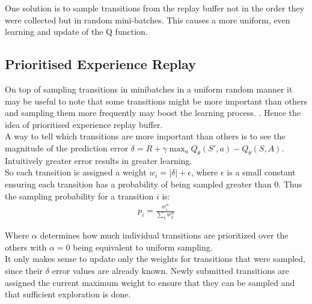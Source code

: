 One solution is to sample transitions from the replay buffer not in the order they were collected but in random mini-batches. This causes a more uniform, even learning and update of the Q function.  


\subsection{Prioritised Experience Replay}

On top of sampling transitions in minibatches in a uniform random manner it may be useful to note that some transitions might be more important than others and sampling them more frequently may boost the learning process. \cite{lecture_dqn}. Hence the idea of prioritised experience replay buffer. \\

A way to tell which transitions are more important than others is to see the magnitude of the prediction error $\delta = R + \gamma \max_a Q_{\theta}(S', a) - Q_{\theta}(S, A)$. 
Intuitively greater error results in greater learning.\\

So each transition is assigned a weight $w_i = |\delta| + \epsilon$, where $\epsilon$ is a small constant ensuring each transition has a probability of being sampled greater than 0. Thus the sampling probability for a transition $i$ is:
\begin{align}
    p_i = \frac{w_i^{\alpha}}{\sum_k w^{\alpha}_k}
\end{align}

Where $\alpha$ determines how much individual transitions are prioritized over the others with $\alpha = 0$ being equivalent to uniform sampling.\\

It only makes sense to update only the weights for transitions that were sampled, since their $\delta$ error values\cite{lecture_dqn} are already known. Newly 
submitted transitions are assigned the current maximum weight to ensure that they can be sampled and that sufficient exploration is done.


